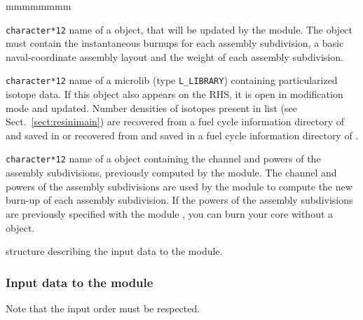 \begin{ListeDeDescription}{mmmmmmmm}

\item[\dusa{FMAP}] \texttt{character*12} name of a  object,
that will be updated by the  module. The  object
must contain the instantaneous burnups for each assembly subdivision, a basic naval-coordinate
assembly layout and the weight of each assembly subdivision.

\item[\dusa{MLIB}] {\tt character*12} name of a {\sc microlib} (type {\tt L\_LIBRARY}) containing particularized isotope data. If this
object also appears on the RHS, it is open in modification mode and updated. Number densities of isotopes present in list 
(see Sect.~\ref{sect:resinimain}) are recovered from a fuel cycle information directory of  and saved in  or
recovered from  and saved in a fuel cycle information directory of .

\item[\dusa{POWER}] \texttt{character*12} name of a  object
containing the channel and powers of the assembly subdivisions, previously computed by the
 module. The channel and powers of the assembly subdivisions are used by the
 module to compute the new burn-up of each assembly subdivision. If the powers
of the assembly subdivisions are previously specified with the module , you can burn
your core without a  object.

\item[\dstr{descsim}] structure describing the input data to the  module.

\end{ListeDeDescription}

\vskip 0.2cm
\subsubsection{Input data to the  module}\label{sect:strsim}

\noindent
Note that the input order must be respected.

